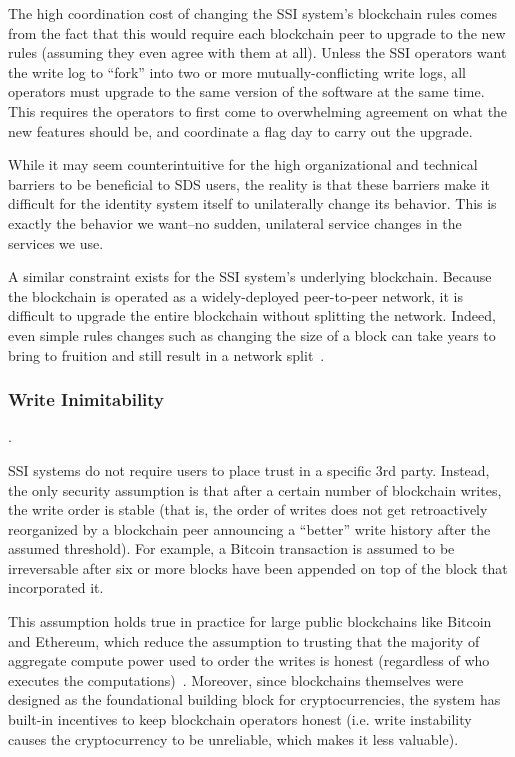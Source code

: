 The high coordination cost of changing the SSI system's blockchain rules
comes from the fact that this would require each blockchain peer to upgrade
to the new rules (assuming they even agree with them at all).  Unless the SSI
operators want the write log to ``fork'' into two or more mutually-conflicting
write logs, all operators must upgrade to the same version of the software
at the same time.  This requires the operators to first come to overwhelming
agreement on what the new features should be, and coordinate a flag day
to carry out the upgrade.

While it may seem counterintuitive for the high organizational and technical
barriers to be beneficial to SDS users, the reality is that these barriers
make it difficult for the identity system itself to unilaterally change its
behavior.  This is exactly the behavior we want--no sudden,
unilateral service changes in the services we use.

A similar constraint exists for the SSI system's underlying blockchain.
Because the blockchain is operated as a widely-deployed peer-to-peer network,
it is difficult to upgrade the entire blockchain without splitting the network.
Indeed, even simple rules changes such as changing the size of a block can take 
years to bring to fruition and still result in a network
split~\cite{bitcoin-cash-split}.

\subsubsection{Write Inimitability}.

SSI systems do not require users to place trust in a specific 3rd
party.  Instead, the only security assumption is that after a certain number
of blockchain writes, the write order is stable (that is, the order of writes does not get
retroactively reorganized by a blockchain peer announcing a ``better'' write
history after the assumed threshold).  For example, a Bitcoin transaction is
assumed to be irreversable after six or more blocks have been appended on top of
the block that incorporated it.

This assumption holds true in
practice for large public blockchains like Bitcoin and Ethereum, which reduce the assumption to trusting
that the majority of aggregate compute power used to order the writes is honest
(regardless of who executes the computations)~\cite{proof-of-work}.  Moreover,
since blockchains themselves were designed as the foundational building block for
cryptocurrencies, the system has built-in incentives to keep blockchain
operators honest (i.e. write instability causes the cryptocurrency to be
unreliable, which makes it less valuable).

